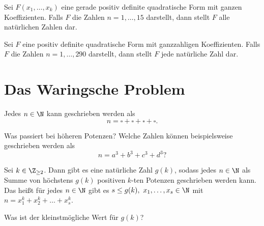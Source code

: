 \begin{thm*}
	Sei $F(x_1,\dotsc,x_k)$ eine gerade positiv definite quadratische Form mit ganzen Koeffizienten. Falls $F$ die Zahlen $n = 1,\dotsc, 15$ darstellt, dann stellt $F$ alle natürlichen Zahlen dar.
\end{thm*}

\begin{thm*}
	Sei $F$ eine positiv definite quadratische Form mit ganzzahligen Koeffizienten. Falls $F$ die Zahlen $n=1, \dotsc, 290$ darstellt, dann stellt $F$ jede natürliche Zahl dar.
\end{thm*}

\section{Das Waringsche Problem}

\begin{thm*}[Jacobi]
	Jedes $n \in \N$ kann geschrieben werden als 
	\[ n = \square + \square + \square + \square. \]
\end{thm*}

\begin{frage*}
	Was passiert bei höheren Potenzen? Welche Zahlen können beispielsweise geschrieben werden als
	\[ n = a^3+b^3+c^3+d^3? \]
\end{frage*}

\begin{thm*}
	Sei $k \in \Z_{\geq 2}$. Dann gibt es eine natürliche Zahl $g(k)$, sodass jedes $n \in \N$ als Summe von höchstens $g(k)$ positiven $k$-ten Potenzen geschrieben werden kann. Das heißt für jedes $n \in \N$ gibt es $s \leq g(k),\ x_1,\dotsc,x_s \in \N$ mit $n = x_1^k + x_2^k + \dotsc + x_s^k$.
\end{thm*}

\begin{frage*}
	Was ist der kleinstmögliche Wert für $g(k)$?
\end{frage*}

